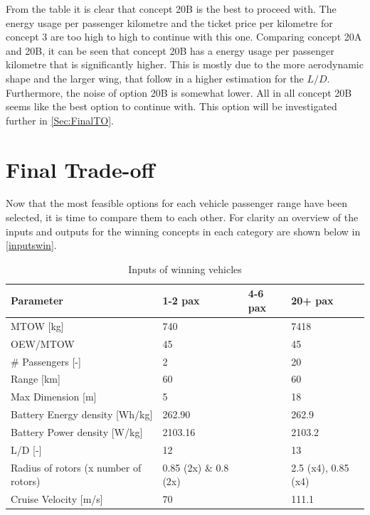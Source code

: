 From the table it is clear that concept 20B is the best to proceed with. The energy usage per passenger kilometre and the ticket price per kilometre for concept 3 are too high to high to continue with this one. Comparing concept 20A and 20B, it can be seen that concept 20B has a energy usage per passenger kilometre that is significantly higher. This is mostly due to the more aerodynamic shape and the larger wing, that follow in a higher estimation for the $L/D$. Furthermore, the noise of option 20B is somewhat lower. All in all concept 20B seems like the best option to continue with. This option will be investigated further in \autoref{Sec:FinalTO}.  




\section{Final Trade-off}
\label{Sec:FinalTO}
Now that the most feasible options for each vehicle passenger range have been selected, it is time to compare them to each other. For clarity an overview of the inputs and outputs for the winning concepts in each category are shown below in \autoref{inputswin}. 

\begin{table}[H]
\captionsetup{justification=centering}
\caption{Inputs of winning vehicles}
\label{inputswin}
\begin{tabular}{llll}
\hline
\textbf{Parameter}                    & \textbf{1-2 pax}      & \textbf{4-6 pax} & \textbf{20+ pax}    \\ \hline
MTOW {[}kg{]}                         & 740                   &                  & 7418                \\
OEW/MTOW        & 45                    &                  & 45                  \\
\# Passengers {[}-{]}                 & 2                     &                  & 20                  \\
Range {[}km{]}                        & 60                    &                  & 60                  \\
Max Dimension {[}m{]}                 & 5                     &                  & 18                  \\
Battery Energy density {[}Wh/kg{]}    & 262.90                &                  & 262.9               \\
Battery Power density {[}W/kg{]}      & 2103.16               &                  & 2103.2              \\
L/D {[}-{]}                           & 12                    &                  & 13                  \\
Radius of rotors (x number of rotors) & 0.85 (2x) \& 0.8 (2x) &                  & 2.5 (x4), 0.85 (x4) \\
Cruise Velocity {[}m/s{]}             & 70                    &                  & 111.1               \\ \hline
\end{tabular}
\end{table}

